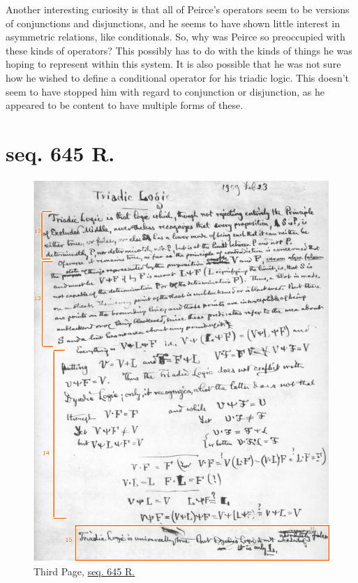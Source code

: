Another interesting curiosity is that all of Peirce's operators seem to be versions of conjunctions and disjunctions, and he seems to have shown little interest in asymmetric relations, like conditionals. So, why was Peirce so preoccupied with these kinds of operators? This possibly has to do with the kinds of things he was hoping to represent within this system. It is also possible that he was not sure how he wished to define a conditional operator for his triadic logic. This doesn't seem to have stopped him with regard to conjunction or disjunction, as he appeared to be content to have multiple forms of these.

\section{seq. 645 R.}

\begin{figure}
    \centering
    \includegraphics[width=\textwidth]{images/page three.jpeg}
    \caption{Third Page, \href{https://iiif.lib.harvard.edu/manifests/view/drs:15255301$645i}{seq. 645 R.}}
    \label{fig:645}
\end{figure}

